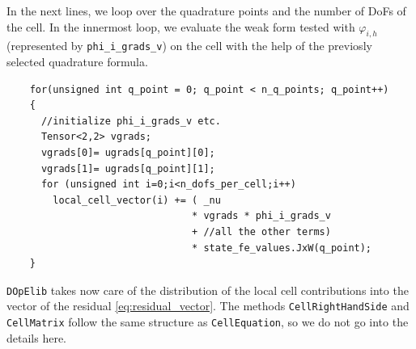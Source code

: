 \documentclass[prodmode,acmtoms]{acmsmall}
\numberwithin{equation}{section}
\renewcommand{\phi}{\varphi}
\newcommand{\dope}{\texttt{DOpElib}}
\begin{document}
In the next lines, we loop over the quadrature points and the number of DoFs of the cell. In the innermost loop, we evaluate the weak form tested with $\phi_{i,h}$ (represented by \texttt{phi\_i\_grads\_v}) on the cell with the help of the previosly selected quadrature formula. 
 \begin{lstlisting}
    for(unsigned int q_point = 0; q_point < n_q_points; q_point++)
    {
      //initialize phi_i_grads_v etc.
      Tensor<2,2> vgrads;
      vgrads[0]= ugrads[q_point][0]; 
      vgrads[1]= ugrads[q_point][1];
      for (unsigned int i=0;i<n_dofs_per_cell;i++)
        local_cell_vector(i) += ( _nu 
                                * vgrads * phi_i_grads_v 
                                + //all the other terms)
                                * state_fe_values.JxW(q_point);
    }
\end{lstlisting}
\dope{} takes now care of the distribution of the local cell contributions into  the vector of the residual \eqref{eq:residual_vector}. The methods \texttt{CellRightHandSide} and \texttt{CellMatrix} follow the same structure as 
\texttt{CellEquation}, so we do not go into the details here.
% 
% 
\end{document}
